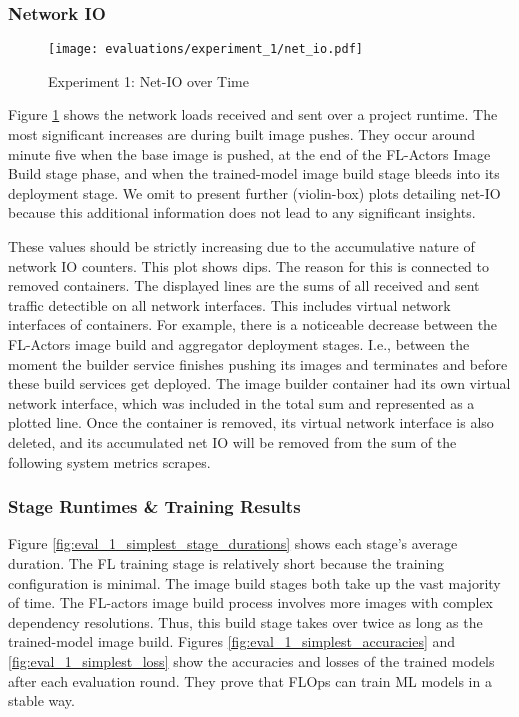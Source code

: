\subsubsection{Network IO}

\begin{figure}[h]
    \begin{adjustwidth}{-0.2\paperwidth}{-0.2\paperwidth}
        \centering
        \texttt{[image: evaluations/experiment\_1/net\_io.pdf]}
        \caption{Experiment 1: Net-IO over Time}
        \label{fig:eval_1_simplest_net_io}
    \end{adjustwidth}
\end{figure}

Figure \ref{fig:eval_1_simplest_net_io} shows the network loads received and sent over a project runtime.
The most significant increases are during built image pushes.
They occur around minute five when the base image is pushed, at the end of the FL-Actors Image Build stage phase, and when the trained-model image build stage bleeds into its deployment stage.
We omit to present further (violin-box) plots detailing net-IO because this additional information does not lead to any significant insights.

These values should be strictly increasing due to the accumulative nature of network IO counters.
This plot shows dips.
The reason for this is connected to removed containers.
The displayed lines are the sums of all received and sent traffic detectible on all network interfaces.
This includes virtual network interfaces of containers.
For example, there is a noticeable decrease between the FL-Actors image build and aggregator deployment stages.
I.e., between the moment the builder service finishes pushing its images and terminates and before these build services get deployed.
The image builder container had its own virtual network interface, which was included in the total sum and represented as a plotted line.
Once the container is removed, its virtual network interface is also deleted, and its accumulated net IO will be removed from the sum of the following system metrics scrapes.

\subsubsection{Stage Runtimes \& Training Results}
Figure \ref{fig:eval_1_simplest_stage_durations} shows each stage's average duration.
The FL training stage is relatively short because the training configuration is minimal.
The image build stages both take up the vast majority of time.
The FL-actors image build process involves more images with complex dependency resolutions.
Thus, this build stage takes over twice as long as the trained-model image build.
Figures \ref{fig:eval_1_simplest_accuracies} and \ref{fig:eval_1_simplest_loss} show the accuracies and losses of the trained models after each evaluation round.
They prove that FLOps can train ML models in a stable way.

